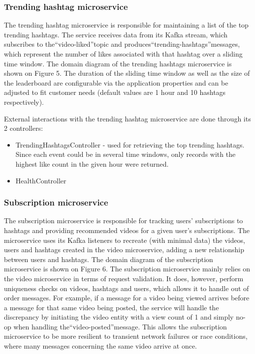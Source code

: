 \documentclass[parskip=full]{article}
\begin{document}
    \subsubsection{Trending hashtag microservice}
    The trending hashtag microservice is responsible for maintaining a list of the top trending hashtags.
    The service receives data from its Kafka stream, which subscribes to the``video-liked''topic and produces``trending-hashtags''messages, which represent the number of likes associated with that hashtag over a sliding time window.
    The domain diagram of the trending hashtags microservice is shown on Figure 5.
    The duration of the sliding time window as well as the size of the leaderboard are configurable via the application properties and can be adjusted to fit customer needs (default values are 1 hour and 10 hashtags respectively).

    External interactions with the trending hashtag microservice are done through its 2 controllers:

    \begin{itemize}
        \item TrendingHashtagsController - used for retrieving the top trending hashtags.
        Since each event could be in several time windows, only records with the highest like count in the given hour were returned.
        \item HealthController
    \end{itemize}

    \subsubsection{Subscription microservice}
    The subscription microservice is responsible for tracking users' subscriptions to hashtags and providing recommended videos for a given user's subscriptions.
    The microservice uses its Kafka listeners to recreate (with minimal data) the videos, users and hashtags created in the video
microservice, adding a new relationship between users and hashtags.
The domain diagram of the subscription microservice is shown on Figure 6.
The subscription microservice mainly relies on the video microservice in terms of request validation.
It does, however, perform uniqueness checks on videos, hashtags and users, which allows it to handle out of order messages.
For example, if a message for a video being viewed arrives before a message for that same video being posted, the service will handle the discrepancy by initiating the video entity with a view count of 1 and simply no-op when handling the``video-posted''message.
This allows the subscription microservice to be more resilient to transient network failures or race conditions, where many messages concerning the same video arrive at once.
\end{document}
